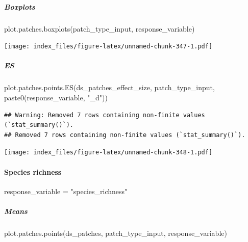 \documentclass[
]{article}
\newenvironment{Shaded}{\begin{snugshade}}{\end{snugshade}}
\newcommand{\FunctionTok}[1]{\textcolor[rgb]{0.00,0.00,0.00}{#1}}
\newcommand{\NormalTok}[1]{#1}
\newcommand{\OtherTok}[1]{\textcolor[rgb]{0.56,0.35,0.01}{#1}}
\newcommand{\StringTok}[1]{\textcolor[rgb]{0.31,0.60,0.02}{#1}}
\begin{document}
\hypertarget{boxplots-26}{%
\subparagraph{Boxplots}\label{boxplots-26}}

\begin{Shaded}
\begin{Highlighting}[]
\FunctionTok{plot.patches.boxplots}\NormalTok{(patch\_type\_input,}
\NormalTok{                       response\_variable)}
\end{Highlighting}
\end{Shaded}

\texttt{[image: index\_files/figure-latex/unnamed-chunk-347-1.pdf]}

\hypertarget{es-10}{%
\subparagraph{ES}\label{es-10}}

\begin{Shaded}
\begin{Highlighting}[]
\FunctionTok{plot.patches.points.ES}\NormalTok{(ds\_patches\_effect\_size, patch\_type\_input,}
                       \FunctionTok{paste0}\NormalTok{(response\_variable, }\StringTok{"\_d"}\NormalTok{))}
\end{Highlighting}
\end{Shaded}

\begin{verbatim}
## Warning: Removed 7 rows containing non-finite values (`stat_summary()`).
## Removed 7 rows containing non-finite values (`stat_summary()`).
\end{verbatim}

\texttt{[image: index\_files/figure-latex/unnamed-chunk-348-1.pdf]}

\hypertarget{species-richness-1}{%
\paragraph{Species richness}\label{species-richness-1}}

\begin{Shaded}
\begin{Highlighting}[]
\NormalTok{response\_variable }\OtherTok{=} \StringTok{"species\_richness"}
\end{Highlighting}
\end{Shaded}

\hypertarget{means-29}{%
\subparagraph{Means}\label{means-29}}

\begin{Shaded}
\begin{Highlighting}[]
\FunctionTok{plot.patches.points}\NormalTok{(ds\_patches, patch\_type\_input,}
\NormalTok{                       response\_variable)}
\end{Highlighting}
\end{Shaded}
\end{document}
